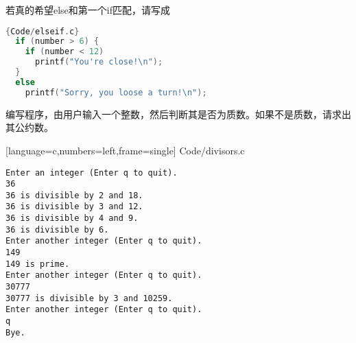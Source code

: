 \begin{frame}[fragile]
若真的希望else和第一个if匹配，请写成
\begin{lstlisting}[language=c,frame=single]{Code/elseif.c}
  if (number > 6) {
    if (number < 12)
      printf("You're close!\n");
  }
  else
    printf("Sorry, you loose a turn!\n");
\end{lstlisting}
\end{frame}

\begin{frame}[fragile]
  \begin{li}
    编写程序，由用户输入一个整数，然后判断其是否为质数。如果不是质数，请求出其公约数。
  \end{li}
\end{frame}

\begin{frame}

[language=c,numbers=left,frame=single]
{Code/divisors.c}
\end{frame}


\begin{frame}
\begin{lstlisting}[backgroundcolor=\color{red!10}]
Enter an integer (Enter q to quit).
36
36 is divisible by 2 and 18.
36 is divisible by 3 and 12.
36 is divisible by 4 and 9.
36 is divisible by 6.
Enter another integer (Enter q to quit).
149
149 is prime.
Enter another integer (Enter q to quit).
30777
30777 is divisible by 3 and 10259.
Enter another integer (Enter q to quit).
q
Bye.
\end{lstlisting}
\end{frame}



